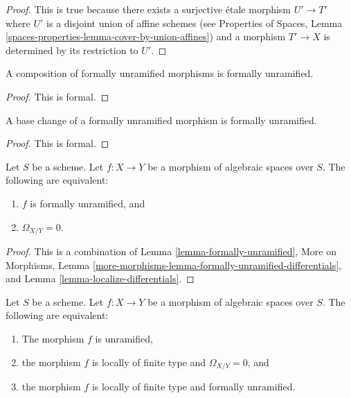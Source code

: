 \begin{proof}
This is true because there exists a surjective \'etale morphism
$U' \to T'$ where $U'$ is a disjoint union of affine schemes (see
Properties of Spaces, Lemma
\ref{spaces-properties-lemma-cover-by-union-affines})
and a morphism $T' \to X$ is determined by its restriction to $U'$.
\end{proof}

\begin{lemma}
\label{lemma-composition-formally-unramified}
A composition of formally unramified morphisms is formally unramified.
\end{lemma}

\begin{proof}
This is formal.
\end{proof}

\begin{lemma}
\label{lemma-base-change-formally-unramified}
A base change of a formally unramified morphism is formally unramified.
\end{lemma}

\begin{proof}
This is formal.
\end{proof}

\begin{lemma}
\label{lemma-characterize-formally-unramified}
Let $S$ be a scheme. Let $f : X \to Y$ be a morphism of algebraic spaces over
$S$. The following are equivalent:
\begin{enumerate}
\item $f$ is formally unramified, and
\item $\Omega_{X/Y} = 0$.
\end{enumerate}
\end{lemma}

\begin{proof}
This is a combination of
Lemma \ref{lemma-formally-unramified},
More on Morphisms,
Lemma \ref{more-morphisms-lemma-formally-unramified-differentials},
and
Lemma \ref{lemma-localize-differentials}.
\end{proof}

\begin{lemma}
\label{lemma-unramified-formally-unramified}
Let $S$ be a scheme.
Let $f : X \to Y$ be a morphism of algebraic spaces over $S$.
The following are equivalent:
\begin{enumerate}
\item The morphism $f$ is unramified,
\item the morphism $f$ is locally of finite type and $\Omega_{X/Y} = 0$, and
\item the morphism $f$ is locally of finite type and formally unramified.
\end{enumerate}
\end{lemma}

